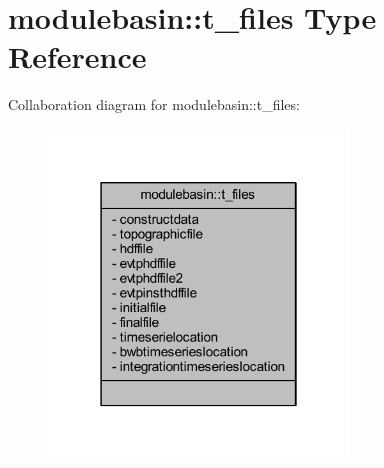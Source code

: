 \hypertarget{structmodulebasin_1_1t__files}{}\section{modulebasin\+:\+:t\+\_\+files Type Reference}
\label{structmodulebasin_1_1t__files}


Collaboration diagram for modulebasin\+:\+:t\+\_\+files\+:\nopagebreak
\begin{figure}[H]
\begin{center}
\leavevmode
\includegraphics[width=226pt]{structmodulebasin_1_1t__files__coll__graph}
\end{center}
\end{figure}
